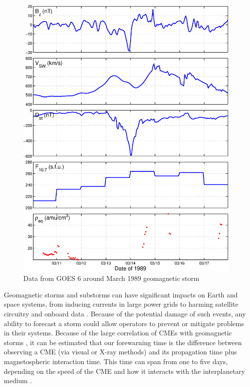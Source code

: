 \begin{figure}[htp!]
	\centering
	\includegraphics[width=1\linewidth]{Figures/alldata-GOES6-10Mar1989-17Mar1989.eps}%
	\caption{Data from GOES 6 around March 1989 geomagnetic storm}
	\label{fig:alldata-GOES6-1989-1989}
\end{figure}



Geomagnetic storms and substorms can have significant impacts on Earth and space systems, from inducing currents in large power grids to harming satellite circuitry and onboard data \citep{1989Storm}. Because of the potential damage of such events, any ability to forecast a storm could allow operators to prevent or mitigate problems in their systems. Because of the large correlation of CMEs with geomagnetic storms \citep{Yermolaev}, it can be estimated that our forewarning time is the difference between observing a CME (via visual or X-ray methods) and its propagation time plus magnetospheric interaction time. This time can span from one to five days, depending on the speed of the CME and how it interacts with the interplanetary medium \citep{StormSources}. 

